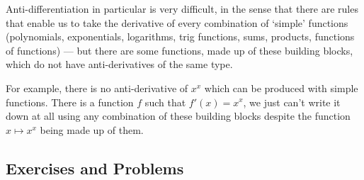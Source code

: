 Anti-differentiation in particular is very difficult, in the sense that there are
rules that enable us to take the derivative of every combination of `simple' functions
(polynomials, exponentials, logarithms, trig functions, sums, products, functions of
functions) --- but there are some functions, made up of these building blocks, which
do not have anti-derivatives of the same type.

For example, there is no anti-derivative of $ x^x $ which can be produced with simple
functions. There is a function $ f $ such that $ f'(x) = x^x $, we just can't write it
down at all using any combination of these building blocks despite the function $ x \mapsto x^x $
being made up of them.

\subsection{Exercises and Problems}
